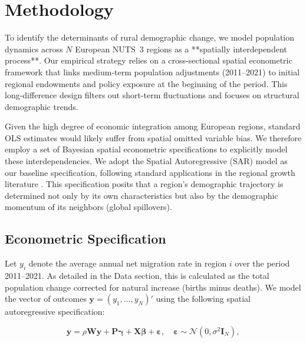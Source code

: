 \documentclass[
	a4paper, %
	10pt, %
]{LTJournalArticle}
\begin{document}


\section{Methodology}

To identify the determinants of rural demographic change, we model population dynamics across $N$ European NUTS~3 regions as a **spatially interdependent process**. Our empirical strategy relies on a cross-sectional spatial econometric framework that links medium-term population adjustments (2011--2021) to initial regional endowments and policy exposure at the beginning of the period. This long-difference design filters out short-term fluctuations and focuses on structural demographic trends.

Given the high degree of economic integration among European regions, standard OLS estimates would likely suffer from spatial omitted variable bias. We therefore employ a set of Bayesian spatial econometric specifications to explicitly model these interdependencies. We adopt the Spatial Autoregressive (SAR) model as our baseline specification, following standard applications in the regional growth literature \citep{piribauer2016bayesian, cuaresma2016forecasting, krisztin2017determinants}. This specification posits that a region's demographic trajectory is determined not only by its own characteristics but also by the demographic momentum of its neighbors (global spillovers).

\subsection{Econometric Specification}

Let $y_i$ denote the average annual net migration rate in region $i$ over the period 2011--2021. As detailed in the Data section, this is calculated as the total population change corrected for natural increase (births minus deaths). We model the vector of outcomes $\mathbf{y} = (y_1, \dots, y_N)'$ using the following spatial autoregressive specification:

\begin{equation}
\label{eq:sar_structural}
\mathbf{y} = \rho \mathbf{W} \mathbf{y} + \mathbf{P} \boldsymbol{\gamma} + \mathbf{X} \boldsymbol{\beta} + \boldsymbol{\varepsilon}, \quad \boldsymbol{\varepsilon} \sim \mathcal{N}(0, \sigma^2 \mathbf{I}_N),
\end{equation}
\end{document}
